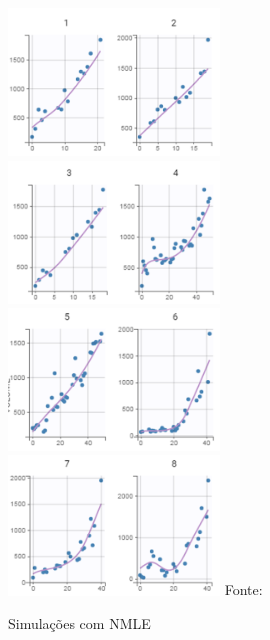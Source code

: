 \documentclass[12pt]{article}
\begin{document}
\begin{figure}[ht]
    \includegraphics[width=0.5\textwidth]{pic/1.png}
    \includegraphics[width=0.5\textwidth]{pic/2.png}
    \includegraphics[width=0.5\textwidth]{pic/3.png}
    \includegraphics[width=0.5\textwidth]{pic/4.png}
    \hspace*{15pt}\hbox{\scriptsize Fonte:}\\
    \caption{Simulações com NMLE}
    \label{fig:map5}
\end{figure}
\end{document}
